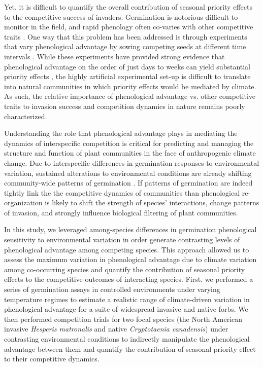 \documentclass{article}[11pt]
\begin{document}
Yet, it is difficult to quantify the overall contribution of seasonal priority effects to the competitive success of invaders. Germination is notorious difficult to monitor in the field, and rapid phenology often co-varies with other competitive traits \citep{Dickson2012,Milbau:2003vt,HAO:2009vh}. %
One way that this problem has been addressed is through experiments that vary phenological advantage by sowing competing seeds at different time intervals \citep{Young:2017aa}. While these experiments have provided strong evidence that phenological advantage on the order of just days to weeks can yield substantial priority effects \citep{Weidlich:2020aa}, the highly artificial experimental set-up is difficult to translate into natural communities in which priority effects would be mediated by climate. As such, the relative importance of phenological advantage vs. other competitive traits to invasion success and competition dynamics in nature remains poorly characterized. %

Understanding the role that phenological advantage plays in mediating the dynamics of interspecific competition is critical for predicting and managing the structure and function of plant communities in the face of anthropogenic climate change. Due  to interspecific differences in germination responses to environmental variation, sustained alterations to environmental conditions are already shifting community-wide patterns of germination \citep{Walck2011}. If patterns of germination are indeed tightly link the the competitive dynamics of communities than phenological re-organization is likely to shift the strength of species' interactions, change patterns of invasion, and strongly influence biological filtering of plant communities. 

In this study, we leveraged among-species differences in germination phenological sensitivity to environmental variation in order generate contrasting levels of phenological advantage among competing species. This approach allowed us to assess the maximum variation in phenological advantage due to climate variation among co-occurring species and quantify the contribution of seasonal priority effects to the competitive outcomes of interacting species. First, we performed a series of germination assays in controlled environments under varying temperature regimes to estimate a realistic range of climate-driven variation in phenological advantage for a suite of widespread invasive and native forbs.  We then performed competition trials for two focal species (the North American invasive \textit{Hesperis matronalis} and native \textit{Cryptotaenia canadensis}) under contrasting environmental conditions to indirectly manipulate the phenological advantage between them and quantify the contribution of seasonal priority effect to their competitive dynamics.
\end{document}

